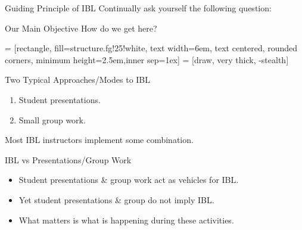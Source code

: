 \documentclass[10pt,handout]{beamer}
\begin{document}
\begin{frame}

\begin{block}{Guiding Principle of IBL}
Continually ask yourself the following question:

\vspace{1em}


\end{block}

\begin{block}{Our Main Objective}
How do we get here?

\begin{center}
 = [rectangle, fill=structure.fg!25!white, text width=6em, text centered, rounded corners, minimum height=2.5em,inner sep=1ex]
 = [draw, very thick, -stealth]
\end{center}
\end{block}

\end{frame}


\begin{frame}

\begin{block}{Two Typical Approaches/Modes to IBL}
\begin{enumerate}
\item Student presentations.
\item Small group work.
\end{enumerate}
Most IBL instructors implement some combination.
\end{block}

\begin{block}{IBL vs Presentations/Group Work}
\begin{itemize}
\item Student presentations \& group work act as vehicles for IBL. 
\item Yet student presentations \& group do not imply IBL. 
\item What matters is what is happening during these activities.
\end{itemize}
\end{block}

\end{frame}
\end{document}
